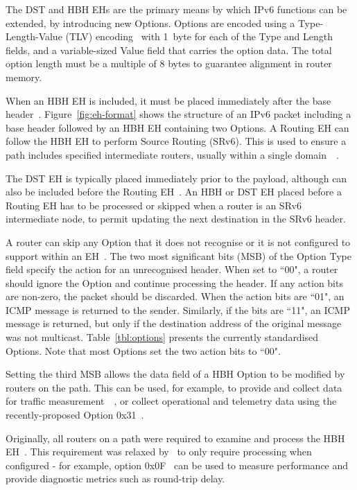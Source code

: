 \documentclass[conference]{IEEEtran}
\begin{document}
The DST and HBH EHs are the primary means by which IPv6 functions
can be extended, by introducing new Options. 
Options are encoded using a Type-Length-Value (TLV)
encoding~\cite{rfc8200} with 1~byte for each of the Type and Length fields, and
a variable-sized Value field that carries the option data. The total option
length must be a multiple of 8 bytes to guarantee alignment in router memory.

When an HBH EH is included, it must be placed immediately after the base
header~\cite{rfc8200}.  Figure~\ref{fig:eh-format} shows the structure of an
IPv6 packet including a base header followed by an HBH EH containing two
Options.  A Routing EH can follow the HBH EH to perform Source
Routing (SRv6). This is used to ensure a path includes specified intermediate
routers, usually within a single domain~\cite{srv6}~\cite{srperf}. 

The DST EH
is typically placed immediately prior to the payload, although can also be included before the Routing EH~\cite{rfc8200}. An HBH or
DST EH placed before a Routing EH has to be processed or skipped when a router is an
SRv6 intermediate node, to permit updating the next destination in the SRv6 header. 


A router can skip any Option that it does not recognise or it is not configured to
support within an EH~\cite{rfc8200}.  The two most significant bits (MSB) of the Option Type field specify
the action for an unrecognised header.  When set to ``00", a router should
ignore the Option and continue processing the header.  If any action bits are
non-zero, the packet should be discarded.  When the action bits are ``01", an
ICMP message is returned to the sender. Similarly, if the bits are ``11",
an ICMP message is returned, but only if the destination address of the original message was not multicast.
Table~\ref{tbl:options} presents the currently standardised Options.  Note that
most Options set the two action bits to ``00".

Setting the third MSB allows the data field of a HBH Option to be modified by
routers on the path. This can be used, for
example, to provide and collect data for traffic measurement~\cite{rfc9268}~\cite{rfc9343}, or collect operational and telemetry
data using the recently-proposed Option 0x31~\cite{ietf-ippm-ioam-ipv6-options-12}.  

Originally, all routers on a
path were required to examine and process the HBH EH~\cite{rfc2460}. This
requirement was relaxed by~\cite{rfc8200} to only require processing when
configured - for example, option 0x0F~\cite{rfc8250} can be used to measure
performance and provide diagnostic metrics such as round-trip delay. 
\end{document}
